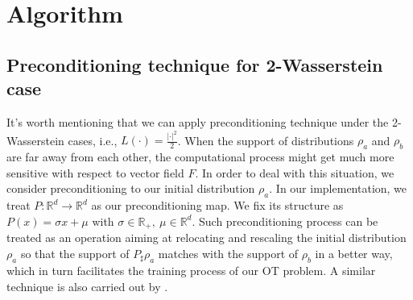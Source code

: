 \documentclass{article}
\begin{document}
\newpage
\section{Algorithm}
\subsection{Preconditioning technique for 2-Wasserstein case}
It's worth mentioning that we can apply preconditioning technique under the 2-Wasserstein cases, i.e., $L(\cdot) = \frac{|\cdot|^2}{2}$. When the support of distributions $\rho_a$ and $\rho_b$ are far away from each other, the computational process might get much more sensitive with respect to vector field ${F}$. In order to deal with this situation, we consider preconditioning to our initial distribution $\rho_a$. In our implementation, we treat $P:\mathbb{R}^d\rightarrow\mathbb{R}^d$ as our preconditioning map. We fix its structure as $P(x) = \sigma x + \mu$ with $\sigma\in\mathbb{R}_+, ~\mu\in\mathbb{R}^d$. Such preconditioning process can be treated as an operation aiming at relocating and rescaling the initial distribution $\rho_a$ so that the support of $P_{\sharp}\rho_a$ matches with the support of $\rho_b$ in a better way, which in turn facilitates the training process of our OT problem. A similar technique is also carried out by \citet{kuang2017preconditioning}. 
\end{document}
